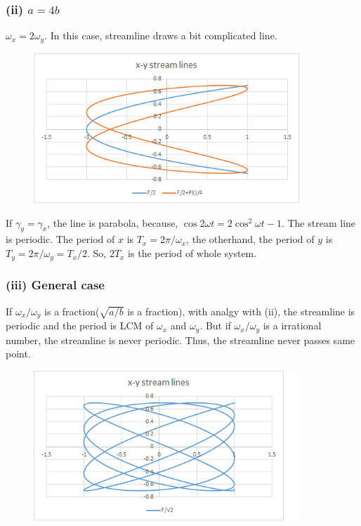 \documentclass{jarticle}
\begin{document}
\subsubsection*{(ii) $a = 4b$}
$\omega_x = 2\omega_y$. In this case, streamline draws a bit complicated line. 
\begin{figure}[htbp]
	\includegraphics[width=10cm]{two_dim_harmonic_streamline_div4.png}
\end{figure}
If $\gamma_y=\gamma_x$, the line is parabola, because, $\cos2\omega t = 2\cos^2\omega t - 1$. 
The stream line is periodic. The period of $x$ is $T_x = 2\pi/\omega_x$, the otherhand, the period of $y$ is $T_y = 2\pi/\omega_y = T_x/2$. So, $2T_x$ is the period of whole system. 

\subsubsection*{(iii) General case}
If $\omega_x / \omega_y$ is a fraction($\sqrt{a/b}$ is a fraction), with analgy with (ii), the streamline is periodic and the period is LCM of $\omega_x$ and $\omega_y$. 
But if $\omega_x / \omega_y$ is a irrational number, the streamline is never periodic. Thus, the streamline never passes same point. 

\begin{figure}[htbp]
	\includegraphics[width=10cm]{two_dim_harmonic_streamline_divsqrt2.png}
\end{figure}
\end{document}
